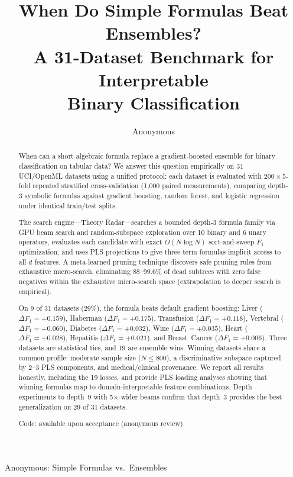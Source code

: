 \documentclass[journal]{IEEEtran}
\begin{document}
\title{When Do Simple Formulas Beat Ensembles?\\
A 31-Dataset Benchmark for Interpretable\\Binary Classification}

\author{Anonymous}

{Anonymous: Simple Formulas vs.\ Ensembles}

\maketitle

\begin{abstract}
When can a short algebraic formula replace a gradient-boosted
ensemble for binary classification on tabular data?  We answer this
question empirically on 31 UCI/OpenML datasets using a unified
protocol: each dataset is evaluated with $200 \times 5$-fold
repeated stratified cross-validation (1{,}000 paired measurements),
comparing depth-3 symbolic formulas against gradient boosting,
random forest, and logistic regression under identical train/test
splits.

The search engine---Theory Radar---searches a bounded depth-3
formula family via GPU beam search and random-subspace exploration
over 10 binary and 6 unary operators, evaluates each candidate with
exact $O(N \log N)$ sort-and-sweep $F_1$ optimization, and uses PLS
projections to give three-term formulas implicit access to all $d$
features.  A meta-learned pruning
technique discovers safe pruning rules from exhaustive micro-search,
eliminating 88--99.6\% of dead subtrees with zero false negatives
within the exhaustive micro-search space (extrapolation to deeper
search is empirical).

On 9 of 31 datasets (29\%), the formula beats default
gradient boosting: Liver ($\Delta F_1 = {+}0.159$), Haberman
($\Delta F_1 = {+}0.175$), Transfusion ($\Delta F_1 = {+}0.118$),
Vertebral ($\Delta F_1 = {+}0.060$), Diabetes
($\Delta F_1 = {+}0.032$), Wine ($\Delta F_1 = {+}0.035$), Heart
($\Delta F_1 = {+}0.028$), Hepatitis ($\Delta F_1 = {+}0.021$),
and Breast~Cancer ($\Delta F_1 = {+}0.006$).  Three datasets are
statistical ties, and 19 are ensemble wins.  Winning datasets share
a common profile: moderate sample size ($N \leq 800$), a
discriminative subspace captured by 2--3 PLS components, and
medical/clinical provenance.  We report all results honestly,
including the 19 losses, and provide PLS loading analyses showing
that winning formulas map to domain-interpretable feature
combinations.  Depth experiments to depth~9 with 5$\times$-wider
beams confirm that depth~3 provides the best generalization on
29 of 31 datasets.

Code: available upon acceptance (anonymous review).
\end{abstract}
\end{document}
